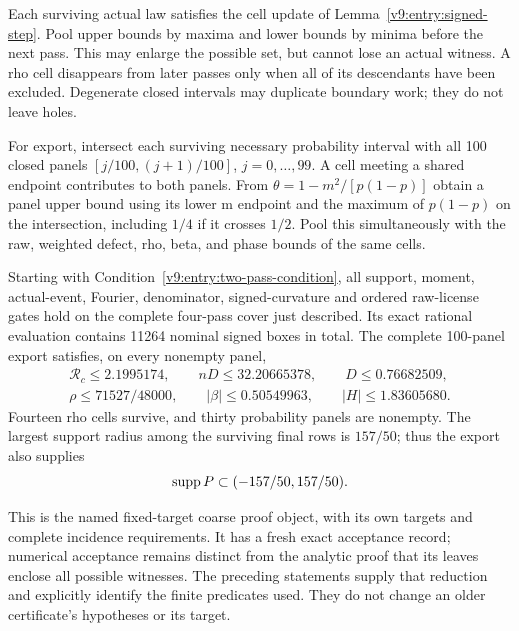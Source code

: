 Each surviving actual law satisfies the cell update of
Lemma~\ref{v9:entry:signed-step}. Pool upper bounds by maxima and lower
bounds by minima before the next pass. This may enlarge the possible
set, but cannot lose an actual witness. A rho cell disappears from later
passes only when all of its descendants have been excluded. Degenerate
closed intervals may duplicate boundary work; they do not leave holes.

For export, intersect each surviving necessary probability interval
with all 100 closed panels $[j/100,(j+1)/100]$, $j=0,\ldots,99$.
A cell meeting a shared endpoint contributes to both panels. From
$\theta=1-m^2/[p(1-p)]$ obtain a panel upper bound using its lower m
endpoint and the maximum of $p(1-p)$ on the intersection, including
$1/4$ if it crosses $1/2$. Pool this simultaneously with the raw,
weighted defect, rho, beta, and phase bounds of the same cells.

\begin{condition}\label{v9:entry:signed-condition}
Starting with Condition~\ref{v9:entry:two-pass-condition}, all support,
moment, actual-event, Fourier, denominator, signed-curvature and ordered
raw-license gates hold on the complete four-pass cover just described.
Its exact rational evaluation contains 11264 nominal signed boxes in
total. The complete 100-panel export satisfies, on every nonempty panel,
\begin{gather*}
 \mathcal R_c\le2.1995174,\qquad nD\le32.20665378,
 \qquad D\le0.76682509,\\
 \rho\le71527/48000,
 \qquad |\beta|\le0.50549963,
 \qquad |H|\le1.83605680.
\end{gather*}
Fourteen rho cells survive, and thirty probability panels are nonempty.
The largest support radius among the surviving final rows is $157/50$;
thus the export also supplies
\begin{equation}\label{v9:entry:exported-support}
 \operatorname{supp} P\subset(-157/50,157/50).
\end{equation}
\end{condition}
This is the named fixed-target coarse proof object, with its own targets
and complete incidence requirements. It has a fresh exact acceptance
record; numerical acceptance remains distinct from the analytic proof
that its leaves enclose all possible witnesses. The preceding statements
supply that reduction and explicitly identify the finite predicates
used. They do not change an older certificate's hypotheses or its target.

